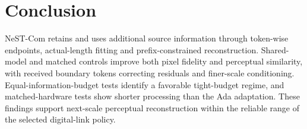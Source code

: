 \section{Conclusion}
NeST-Com retains and uses additional source information through token-wise endpoints, actual-length fitting and prefix-constrained reconstruction. Shared-model and matched controls improve both pixel fidelity and perceptual similarity, with received boundary tokens correcting residuals and finer-scale conditioning. Equal-information-budget tests identify a favorable tight-budget regime, and matched-hardware tests show shorter processing than the Ada adaptation. These findings support next-scale perceptual reconstruction within the reliable range of the selected digital-link policy.
